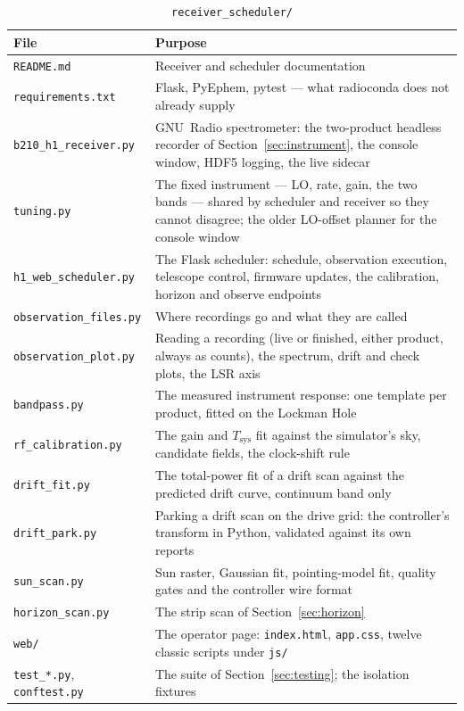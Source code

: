 \documentclass[11pt,a4paper]{article}
\begin{document}
\begin{table}[H]
\centering
\caption{\texttt{receiver\_scheduler/}}
\small
\begin{tabular}{lp{9.0cm}}
\toprule
\textbf{File} & \textbf{Purpose} \\
\midrule
\texttt{README.md} & Receiver and scheduler documentation \\
\texttt{requirements.txt} & Flask, PyEphem, pytest --- what radioconda does not already supply \\
\texttt{b210\_h1\_receiver.py} & GNU~Radio spectrometer: the two-product headless recorder of Section~\ref{sec:instrument}, the console window, HDF5 logging, the live sidecar \\
\texttt{tuning.py} & The fixed instrument --- LO, rate, gain, the two bands --- shared by scheduler and receiver so they cannot disagree; the older LO-offset planner for the console window \\
\texttt{h1\_web\_scheduler.py} & The Flask scheduler: schedule, observation execution, telescope control, firmware updates, the calibration, horizon and observe endpoints \\
\texttt{observation\_files.py} & Where recordings go and what they are called \\
\texttt{observation\_plot.py} & Reading a recording (live or finished, either product, always as counts), the spectrum, drift and check plots, the LSR axis \\
\texttt{bandpass.py} & The measured instrument response: one template per product, fitted on the Lockman Hole \\
\texttt{rf\_calibration.py} & The gain and $T_\text{sys}$ fit against the simulator's sky, candidate fields, the clock-shift rule \\
\texttt{drift\_fit.py} & The total-power fit of a drift scan against the predicted drift curve, continuum band only \\
\texttt{drift\_park.py} & Parking a drift scan on the drive grid: the controller's transform in Python, validated against its own reports \\
\texttt{sun\_scan.py} & Sun raster, Gaussian fit, pointing-model fit, quality gates and the controller wire format \\
\texttt{horizon\_scan.py} & The strip scan of Section~\ref{sec:horizon} \\
\texttt{web/} & The operator page: \texttt{index.html}, \texttt{app.css}, twelve classic scripts under \texttt{js/} \\
\texttt{test\_*.py}, \texttt{conftest.py} & The suite of Section~\ref{sec:testing}; the isolation fixtures \\

\end{tabular}
\end{table}
\end{document}
